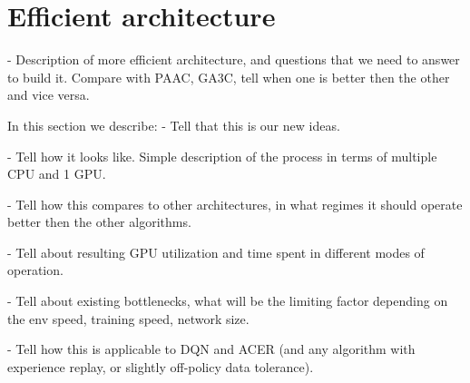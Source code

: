 \section{Efficient architecture}

- Description of more efficient architecture, and questions that we need to
  answer to build it. Compare with PAAC, GA3C, tell when one is better then
  the other and vice versa.

In this section we describe:
- Tell that this is our new ideas.

- Tell how it looks like. Simple description of the process in terms of multiple CPU and 1 GPU.

- Tell how this compares to other architectures, in what regimes it should operate better then
the other algorithms.

- Tell about resulting GPU utilization and time spent in different modes of operation.

- Tell about existing bottlenecks, what will be the limiting factor depending on the env speed,
training speed, network size.

- Tell how this is applicable to DQN and ACER (and any algorithm with experience replay, or
slightly off-policy data tolerance).
